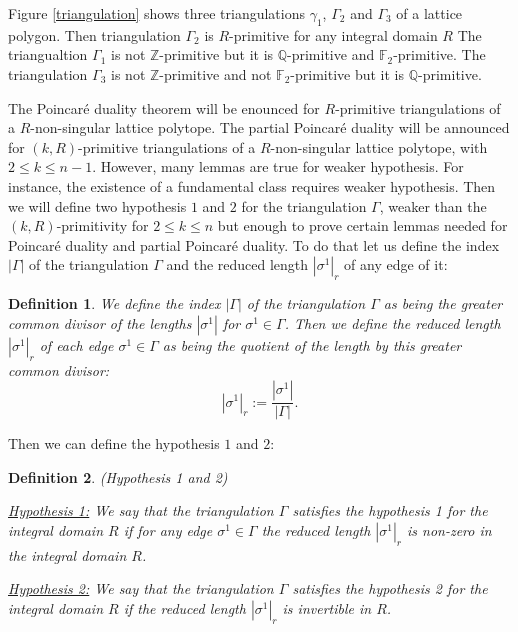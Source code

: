 \documentclass{article}
\newtheorem{definition}{Definition}
\begin{document}
Figure \ref{triangulation} shows three triangulations $\gamma_1$, $\Gamma_2$ and $\Gamma_3$ of a lattice polygon. Then triangulation $\Gamma_2$ is $R$-primitive for any integral domain $R$ The triangualtion $\Gamma_1$ is not $\mathbb{Z}$-primitive but it is $\mathbb{Q}$-primitive and $\mathbb{F}_2$-primitive. The triangulation $\Gamma_3$ is not $\mathbb{Z}$-primitive and not $\mathbb{F}_2$-primitive but it is $\mathbb{Q}$-primitive.

The Poincaré duality theorem will be enounced for $R$-primitive triangulations of a $R$-non-singular lattice polytope. The partial Poincaré duality will be announced for $(k,R)$-primitive triangulations of a $R$-non-singular lattice polytope, with $2\leq k \leq n-1$. However, many lemmas are true for weaker hypothesis. For instance, the existence of a fundamental class requires weaker hypothesis. Then we will define two hypothesis $1$ and $2$ for the triangulation $\Gamma$, weaker than the $(k,R)$-primitivity for $2\leq k \leq n$ but enough to prove certain lemmas needed for Poincaré duality and partial Poincaré duality. To do that let us define the index $|\Gamma|$ of the triangulation $\Gamma$ and the reduced length $|\sigma^1|_r$ of any edge of it:

\begin{definition}
    We define the index $|\Gamma|$ of the triangulation $\Gamma$ as being the greater common divisor of the lengths $|\sigma^1|$ for $\sigma^1 \in \Gamma$. Then we define the reduced length $|\sigma^1|_r$ of each edge $\sigma^1 \in \Gamma$ as being the quotient of the length by this greater common divisor:
    \begin{equation*}
        |\sigma^1|_r:= \frac{|\sigma^1|}{|\Gamma|}.
    \end{equation*}
    \label{redlength}
\end{definition}

Then we can define the hypothesis $1$ and $2$:

\begin{definition}
    (Hypothesis 1 and 2)
    
    \underline{Hypothesis 1:} We say that the triangulation $\Gamma$ satisfies the hypothesis 1 for the integral domain $R$ if for any edge $\sigma^1 \in \Gamma$ the reduced length $|\sigma^1|_r$ is non-zero in the integral domain $R$.
    
    \underline{Hypothesis 2:} We say that the triangulation $\Gamma$ satisfies the hypothesis 2 for the integral domain $R$ if the reduced length $|\sigma^1|_r$ is invertible in $R$.
    \label{max}
\end{definition}
\end{document}
